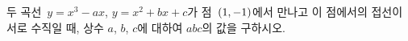 두 곡선~$y=x^3-ax$, $y=x^2+bx+c$가 점~$(1{,}\mkern3mu\mathopen{}-1)$에서 만나고 이 점에서의 접선이 서로 수직일 때, 상수 $a$, $b$, $c$에 대하여 $abc$의 값을 구하시오.
